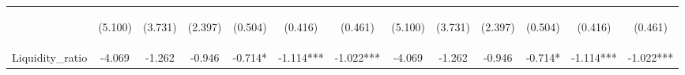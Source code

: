\documentclass[]{article}
\begin{document}
\begin{center}
\begin{tabular}{lcccccccccccc}
\vspace{4pt} & \begin{footnotesize}(5.100)\end{footnotesize} & \begin{footnotesize}(3.731)\end{footnotesize} & \begin{footnotesize}(2.397)\end{footnotesize} & \begin{footnotesize}(0.504)\end{footnotesize} & \begin{footnotesize}(0.416)\end{footnotesize} & \begin{footnotesize}(0.461)\end{footnotesize} & \begin{footnotesize}(5.100)\end{footnotesize} & \begin{footnotesize}(3.731)\end{footnotesize} & \begin{footnotesize}(2.397)\end{footnotesize} & \begin{footnotesize}(0.504)\end{footnotesize} & \begin{footnotesize}(0.416)\end{footnotesize} & \begin{footnotesize}(0.461)\end{footnotesize} \\
Liquidity\_ratio & -4.069 & -1.262 & -0.946 & -0.714* & -1.114*** & -1.022*** & -4.069 & -1.262 & -0.946 & -0.714* & -1.114*** & -1.022*** \\

\end{tabular}
\end{center}
\end{document}
